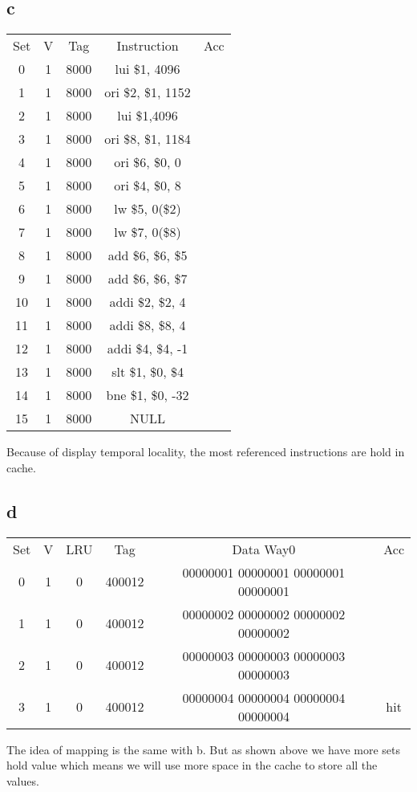 \documentclass[]{article}
\begin{document}
\subsection*{c}
\begin{center}
	\begin{tabular}{c c c c c }
		Set & V & Tag & Instruction & Acc \\
	    0   & 1 & 8000 &  lui \$1, 4096&\\
	    1   & 1 & 8000 &  ori \$2, \$1, 1152&\\
	    2   & 1 & 8000 &  lui \$1,4096&\\
	    3   & 1 & 8000 &  ori \$8, \$1, 1184&\\
	    4   & 1 & 8000 &  ori \$6, \$0, 0&\\ 
	    5   & 1 & 8000 &  ori \$4, \$0, 8&\\
	    6   & 1 & 8000 &  lw  \$5, 0(\$2)&\\
	    7   & 1 & 8000 &  lw  \$7, 0(\$8)&\\
	    8   & 1 & 8000 &  add  \$6, \$6, \$5&\\
	    9   & 1 & 8000 &  add  \$6, \$6, \$7&\\
	    10  & 1 & 8000 &  addi \$2, \$2, 4&\\
	    11  & 1 & 8000 &  addi \$8, \$8, 4&\\
	    12  & 1 & 8000 &  addi \$4, \$4, -1&\\
	    13  & 1 & 8000 &  slt \$1, \$0, \$4&\\
	    14  & 1 & 8000 &  bne \$1, \$0, -32&\\
	    15  & 1 & 8000 &  NULL&\\    
 	\end{tabular}
\end{center}
Because of display temporal locality, the most referenced instructions are hold in  cache. 
\subsection*{d}
\begin{center}
	\begin{tabular}{c c c c c c}
		Set & V & LRU & Tag & Data Way0 & Acc \\
		0  & 1 & 0  & 400012 & 00000001 00000001  00000001 00000001& \\
		1  & 1 & 0  & 400012 & 00000002 00000002  00000002 00000002& \\  
		2  & 1 & 0  & 400012 & 00000003 00000003  00000003 00000003& \\		
		3  & 1 & 0  & 400012 & 00000004 00000004  00000004 00000004&hit \\
	\end{tabular}
\end{center}
The idea of mapping is the same with b. But as shown above we have more sets hold value which means we will use more space in the cache to store all the values.
\end{document}
